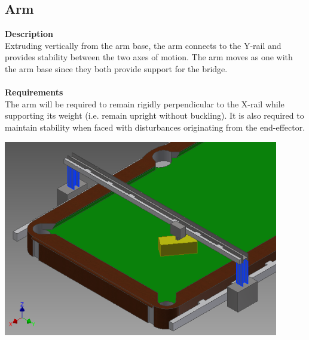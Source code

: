 \documentclass[titlepage]{article}
\begin{document}
\subsection{Arm}
\textbf{Description}\\
Extruding vertically from the arm base, the arm connects to the Y-rail and provides stability between the two axes of motion. The arm moves as one with the arm base since they both provide support for the bridge.\\\\
\textbf{Requirements}\\
The arm will be required to remain rigidly perpendicular to the X-rail while supporting its weight (i.e. remain upright without buckling). It is also required to maintain stability when faced with disturbances originating from the end-effector.
\begin{center}
	\includegraphics[width = 0.9\textwidth]{arms.png}
\label{fig:armFig}
\end{center}

\newpage
\end{document}
